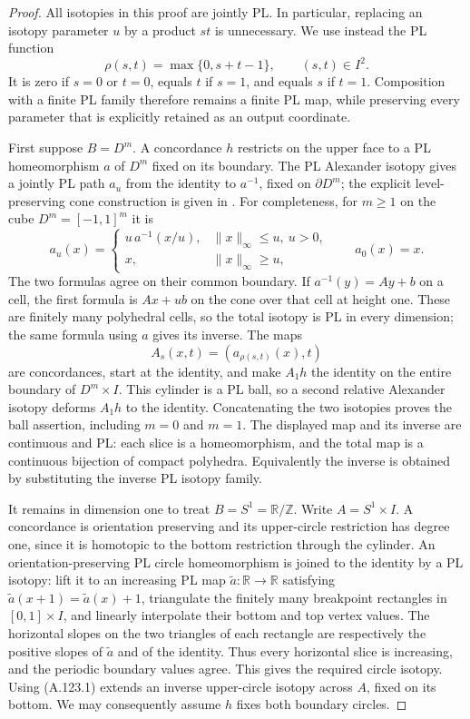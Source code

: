 \begin{proof}
All isotopies in this proof are jointly PL. In particular,
replacing an isotopy parameter $u$ by a product $st$ is unnecessary.
We use instead the PL function
\[
 \rho(s,t)=\max\{0,s+t-1\},\qquad (s,t)\in I^2.
                                                               \tag{A.123.1}
\]
It is zero if $s=0$ or $t=0$, equals $t$ if $s=1$, and equals
$s$ if $t=1$. Composition with a finite PL family therefore
remains a finite PL map, while preserving every parameter that
is explicitly retained as an output coordinate.

First suppose $B=D^m$. A concordance $h$ restricts on the upper
face to a PL homeomorphism $a$ of $D^m$ fixed on its boundary.
The PL Alexander isotopy gives a jointly PL path $a_u$ from the
identity to $a^{-1}$, fixed on $\partial D^m$; the explicit
level-preserving cone construction is given in
\cite[Theorem~5.2, pp.~95--96]{Epstein1966}.
For completeness, for $m\geq1$ on the cube $D^m=[-1,1]^m$ it is
\[
 a_u(x)=
 \begin{cases}
 u\,a^{-1}(x/u),&\|x\|_\infty\leq u,\ u>0,\\
 x,&\|x\|_\infty\geq u,
 \end{cases}
 \qquad a_0(x)=x.
\]
The two formulas agree on their common boundary. If
$a^{-1}(y)=Ay+b$ on a cell, the first formula is $Ax+ub$
on the cone over that cell at height one. These are finitely
many polyhedral cells, so the total isotopy is PL in every
dimension; the same formula using $a$ gives its inverse.
The maps
\[
 A_s(x,t)=(a_{\rho(s,t)}(x),t)
\]
are concordances, start at the identity, and make $A_1h$ the
identity on the entire boundary of $D^m\times I$.
This cylinder is a PL ball, so a second relative Alexander
isotopy deforms $A_1h$ to the identity. Concatenating the two
isotopies proves the ball assertion, including $m=0$ and $m=1$.
The displayed map and its inverse are continuous and PL: each
slice is a homeomorphism, and the total map is a continuous
bijection of compact polyhedra. Equivalently the inverse is
obtained by substituting the inverse PL isotopy family.

It remains in dimension one to treat $B=S^1=\mathbb R/\mathbb Z$.
Write $A=S^1\times I$. A concordance is orientation preserving
and its upper-circle restriction has degree one, since it is
homotopic to the bottom restriction through the cylinder.
An orientation-preserving PL circle homeomorphism is joined to
the identity by a PL isotopy: lift it to an increasing PL map
$\widetilde a:\mathbb R\to\mathbb R$ satisfying
$\widetilde a(x+1)=\widetilde a(x)+1$, triangulate the finitely
many breakpoint rectangles in $[0,1]\times I$, and linearly
interpolate their bottom and top vertex values. The horizontal
slopes on the two triangles of each rectangle are respectively
the positive slopes of $\widetilde a$ and of the identity.
Thus every horizontal slice is increasing, and the periodic
boundary values agree. This gives the required circle isotopy.
Using (A.123.1) extends an inverse upper-circle isotopy across
$A$, fixed on its bottom. We may consequently assume $h$ fixes
both boundary circles.


\end{proof}
